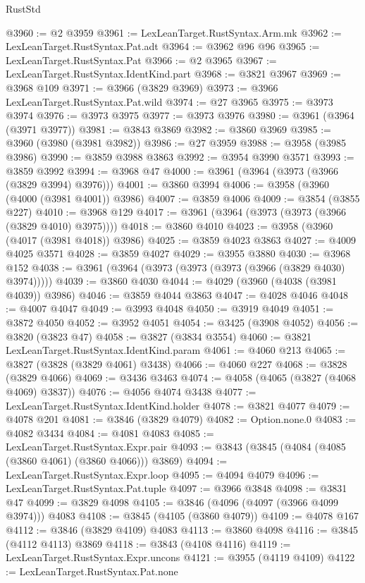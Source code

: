 \begin{lexlean}{RustStd}
\begin{coremodule}
@3960 := @2 @3959
@3961 := LexLeanTarget.RustSyntax.Arm.mk
@3962 := LexLeanTarget.RustSyntax.Pat.adt
@3964 := @3962 @96 @96
@3965 := LexLeanTarget.RustSyntax.Pat
@3966 := @2 @3965
@3967 := LexLeanTarget.RustSyntax.IdentKind.part
@3968 := @3821 @3967
@3969 := @3968 @109
@3971 := @3966 (@3829 @3969)
@3973 := @3966 LexLeanTarget.RustSyntax.Pat.wild
@3974 := @27 @3965
@3975 := @3973 @3974
@3976 := @3973 @3975
@3977 := @3973 @3976
@3980 := @3961 (@3964 (@3971 @3977))
@3981 := @3843 @3869
@3982 := @3860 @3969
@3985 := @3960 (@3980 (@3981 @3982))
@3986 := @27 @3959
@3988 := @3958 (@3985 @3986)
@3990 := @3859 @3988 @3863
@3992 := @3954 @3990 @3571
@3993 := @3859 @3992
@3994 := @3968 @47
@4000 := @3961 (@3964 (@3973 (@3966 (@3829 @3994) @3976)))
@4001 := @3860 @3994
@4006 := @3958 (@3960 (@4000 (@3981 @4001)) @3986)
@4007 := @3859 @4006
@4009 := @3854 (@3855 @227)
@4010 := @3968 @129
@4017 := @3961 (@3964 (@3973 (@3973 (@3966 (@3829 @4010) @3975))))
@4018 := @3860 @4010
@4023 := @3958 (@3960 (@4017 (@3981 @4018)) @3986)
@4025 := @3859 @4023 @3863
@4027 := @4009 @4025 @3571
@4028 := @3859 @4027
@4029 := @3955 @3880
@4030 := @3968 @152
@4038 := @3961 (@3964 (@3973 (@3973 (@3973 (@3966 (@3829 @4030) @3974)))))
@4039 := @3860 @4030
@4044 := @4029 (@3960 (@4038 (@3981 @4039)) @3986)
@4046 := @3859 @4044 @3863
@4047 := @4028 @4046
@4048 := @4007 @4047
@4049 := @3993 @4048
@4050 := @3919 @4049
@4051 := @3872 @4050
@4052 := @3952 @4051
@4054 := @3425 (@3908 @4052)
@4056 := @3820 (@3823 @47)
@4058 := @3827 (@3834 @3554)
@4060 := @3821 LexLeanTarget.RustSyntax.IdentKind.param
@4061 := @4060 @213
@4065 := @3827 (@3828 (@3829 @4061) @3438)
@4066 := @4060 @227
@4068 := @3828 (@3829 @4066)
@4069 := @3436 @3463
@4074 := @4058 (@4065 (@3827 (@4068 @4069) @3837))
@4076 := @4056 @4074 @3438
@4077 := LexLeanTarget.RustSyntax.IdentKind.holder
@4078 := @3821 @4077
@4079 := @4078 @201
@4081 := @3846 (@3829 @4079)
@4082 := Option.none.{0}
@4083 := @4082 @3434
@4084 := @4081 @4083
@4085 := LexLeanTarget.RustSyntax.Expr.pair
@4093 := @3843 (@3845 (@4084 (@4085 (@3860 @4061) (@3860 @4066))) @3869)
@4094 := LexLeanTarget.RustSyntax.Expr.loop
@4095 := @4094 @4079
@4096 := LexLeanTarget.RustSyntax.Pat.tuple
@4097 := @3966 @3848
@4098 := @3831 @47
@4099 := @3829 @4098
@4105 := @3846 (@4096 (@4097 (@3966 @4099 @3974))) @4083
@4108 := @3845 (@4105 (@3860 @4079))
@4109 := @4078 @167
@4112 := @3846 (@3829 @4109) @4083
@4113 := @3860 @4098
@4116 := @3845 (@4112 @4113) @3869
@4118 := @3843 (@4108 @4116)
@4119 := LexLeanTarget.RustSyntax.Expr.uncons
@4121 := @3955 (@4119 @4109)
@4122 := LexLeanTarget.RustSyntax.Pat.none

\end{coremodule}
\end{lexlean}
